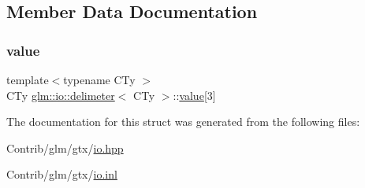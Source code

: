 \subsection{Member Data Documentation}
\mbox{\label{structglm_1_1io_1_1delimeter_a9ade129dae50c4f716f724e7425f9c68}} 
\subsubsection{\texorpdfstring{value}{value}}
{\footnotesize\ttfamily template$<$typename C\+Ty $>$ \\
C\+Ty \mbox{\hyperlink{structglm_1_1io_1_1delimeter}{glm\+::io\+::delimeter}}$<$ C\+Ty $>$\+::\mbox{\hyperlink{_s_d_l__opengl__glext_8h_a8ad81492d410ff2ac11f754f4042150f}{value}}\mbox{[}3\mbox{]}}



The documentation for this struct was generated from the following files\+:\begin{DoxyCompactItemize}
\item 
Contrib/glm/gtx/\mbox{\hyperlink{io_8hpp}{io.\+hpp}}\item 
Contrib/glm/gtx/\mbox{\hyperlink{io_8inl}{io.\+inl}}\end{DoxyCompactItemize}
